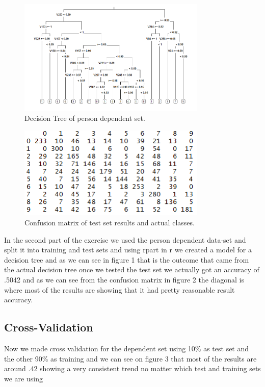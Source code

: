 \documentclass[paper=a4, fontsize=11pt]{scrartcl} %
\begin{document}
\begin{figure}[h]
	\centering
	\includegraphics[width=0.8\textwidth]{figures/decisionTree.png}
	\caption{Decision Tree of person dependent set.}
	\label{fig:scree}
\end{figure}

\begin{figure}[h]
	\centering
	\includegraphics[width=0.8\textwidth]{figures/confusionMatrix.png}
	\caption{Confusion matrix of test set results and actual classes.}
	\label{fig:scree}
\end{figure}


In the second part of the exercise we used the person dependent data-set and split it into training and test sets and using rpart in r we created a model for a decision tree and as we can see in figure 1 that is the outcome that came from the actual decision tree once we tested the test set we actually got an accuracy of .5042 and as we can see from the confusion matrix in figure 2 the diagonal is where most of the results are showing that it had pretty reasonable result accuracy.


\clearpage
\subsection{Cross-Validation}
Now we made cross validation for the dependent set using 10\% as test set and the other 90\% as training and we can see on figure 3 that most of the results are around .42 showing a very consistent trend no matter which test and training sets we are using
\end{document}
